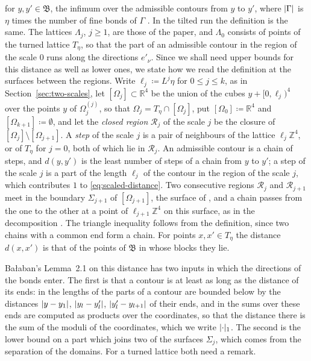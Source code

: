 \documentclass[11pt]{preprint}
\DeclarePairedDelimiter{\abs}{\lvert}{\rvert}
\numberwithin{equation}{section}
\theoremstyle{definition}
\theoremstyle{remark}
\theoremstyle{plain}
\begin{document}
for $y, y' \in \mathfrak B$, the infimum over the admissible contours from $y$ to $y'$, where $\abs\Gamma$ is $\eta$ times the number of fine bonds of $\Gamma$ \cite[(2.46), p.~231]{BalabanPRT2}. In the tilted run the definition is the same. The lattices $\Lambda_j$, $j \geq 1$, are those of the paper, and $\Lambda_0$ consists of points of the turned lattice $T_\eta$, so that the part of an admissible contour in the region of the scale $0$ runs along the directions $e'_\nu$. Since we shall need upper bounds for this distance as well as lower ones, we state how we read the definition at the surfaces between the regions. Write $\ell_j \coloneqq L^j\eta$ for $0 \leq j \leq k$, as in Section~\ref{sec:two-scales}, let $[\Omega_j] \subset \mathbb R^4$ be the union of the cubes $y + [0, \ell_j)^4$ over the points $y$ of $\Omega_j^{(j)}$, so that $\Omega_j = T_\eta \cap [\Omega_j]$, put $[\Omega_0] \coloneqq \mathbb R^4$ and $[\Omega_{k+1}] \coloneqq \emptyset$, and let the \emph{closed region} $\mathcal R_j$ of the scale $j$ be the closure of $[\Omega_j] \setminus [\Omega_{j+1}]$. A \emph{step} of the scale $j$ is a pair of neighbours of the lattice $\ell_j\mathbb Z^4$, or of $T_\eta$ for $j = 0$, both of which lie in $\mathcal R_j$. An admissible contour is a chain of steps, and $d(y, y')$ is the least number of steps of a chain from $y$ to $y'$; a step of the scale $j$ is a part of the length $\ell_j$ of the contour in the region of the scale $j$, which contributes $1$ to \eqref{eq:scaled-distance}. Two consecutive regions $\mathcal R_j$ and $\mathcal R_{j+1}$ meet in the boundary $\Sigma_{j+1}$ of $[\Omega_{j+1}]$, the surface of \cite[p.~231]{BalabanPRT2}, and a chain passes from the one to the other at a point of $\ell_{j+1}\mathbb Z^4$ on this surface, as in the decomposition \cite[(2.47)]{BalabanPRT2}. The triangle inequality \cite[(2.54)]{BalabanPRT2} follows from the definition, since two chains with a common end form a chain. For points $x, x' \in T_\eta$ the distance $d(x, x')$ is that of the points of $\mathfrak B$ in whose blocks they lie.

Ba{\l}aban's Lemma~2.1 on this distance has two inputs in which the directions of the bonds enter. The first is that a contour is at least as long as the distance of its ends: in \cite[(2.48), p.~232]{BalabanPRT2} the lengths of the parts of a contour are bounded below by the distances $\abs{y - y_1}$, $\abs{y_l - y'_l}$, $\abs{y'_l - y_{l+1}}$ of their ends, and in \cite[(2.58), p.~233]{BalabanPRT2} the sums over these ends are computed as products over the coordinates, so that the distance there is the sum of the moduli of the coordinates, which we write $\abs\cdot_1$. The second is the lower bound \cite[(2.57)]{BalabanPRT2} on a part which joins two of the surfaces $\Sigma_j$, which comes from the separation \cite[(2.2), p.~224]{BalabanPRT2} of the domains. For a turned lattice both need a remark.
\end{document}
